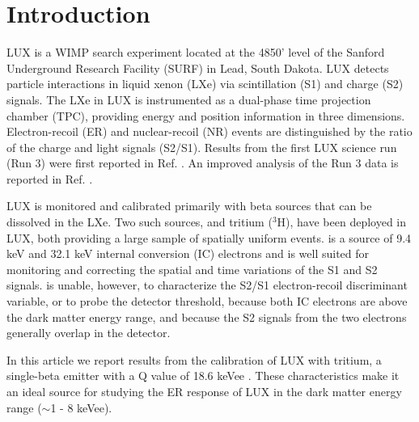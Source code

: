 \section{Introduction}

LUX is a WIMP search experiment located at the 4850' level of the Sanford Underground Research Facility (SURF) in Lead, South Dakota. LUX detects particle interactions in liquid xenon (LXe) via scintillation (S1) and charge (S2) signals. The LXe in LUX is instrumented as a dual-phase time projection chamber (TPC), providing energy and position information in three dimensions. Electron-recoil (ER) and nuclear-recoil (NR) events are distinguished by the ratio of the charge and light signals (S2/S1). Results from the first LUX science run (Run 3) were first reported in Ref. \cite{lux-prl}. An improved analysis of the Run 3 data is reported in Ref. \cite{lux-reanalysis}.


LUX is monitored and calibrated primarily with beta sources that can be dissolved in the LXe. 
Two such sources,  \krsrc\cite{Kastens:2009rt, Baudis} and tritium ($^{3}$H), have been deployed in LUX, both providing a large sample of spatially uniform events. \krsrc is a source of 9.4 keV and 32.1 keV internal conversion  (IC) electrons and is well suited for monitoring and correcting the spatial and time variations of the S1 and S2 signals. \krsrc is unable, however, to characterize the S2/S1 electron-recoil discriminant variable, or to probe the detector threshold, because both IC electrons are above the dark matter energy range, and because the S2 signals from the two electrons generally overlap in the detector.

In this article we report results from the calibration of LUX with tritium, a single-beta emitter with a Q value of 18.6 keVee \cite{Tritium_Q}.  These characteristics make it an ideal source for studying the ER response of LUX in the dark matter energy range ($\sim$1 - 8 keVee). 

